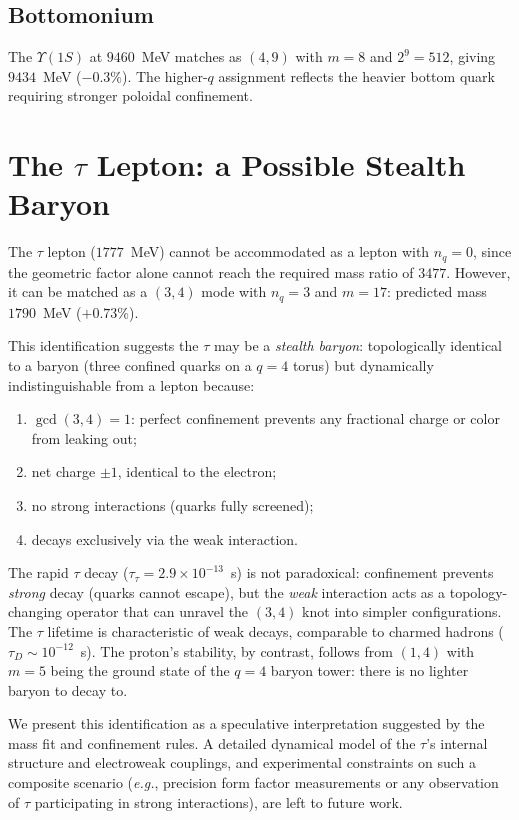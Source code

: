 \documentclass[11pt,a4paper]{article}
\begin{document}
\subsection{Bottomonium}

The $\Upsilon(1S)$ at $9460$~MeV matches as $(4,9)$ with $m = 8$
and $2^9 = 512$, giving $9434$~MeV ($-0.3\%$).  The higher-$q$
assignment reflects the heavier bottom quark requiring stronger
poloidal confinement.


\section{The $\tau$ Lepton: a Possible Stealth Baryon}
\label{sec:tau}

The $\tau$ lepton ($1777$~MeV) cannot be accommodated as a
lepton with $n_q = 0$, since the geometric factor alone cannot
reach the required mass ratio of $3477$.  However, it can be matched as a $(3,4)$ mode with $n_q = 3$ and $m = 17$:
predicted mass $1790$~MeV ($+0.73\%$).

This identification suggests the $\tau$ may be a \emph{stealth baryon}:
topologically identical to a baryon (three confined quarks on a
$q = 4$ torus) but dynamically indistinguishable from a lepton
because:
\begin{enumerate}
  \item $\gcd(3,4) = 1$: perfect confinement prevents any
    fractional charge or color from leaking out;
  \item net charge $\pm 1$, identical to the electron;
  \item no strong interactions (quarks fully screened);
  \item decays exclusively via the weak interaction.
\end{enumerate}

The rapid $\tau$ decay ($\tau_\tau = 2.9 \times 10^{-13}$~s)
is not paradoxical: confinement prevents \emph{strong} decay
(quarks cannot escape), but the \emph{weak} interaction acts
as a topology-changing operator that can unravel the $(3,4)$
knot into simpler configurations.  The $\tau$ lifetime is
characteristic of weak decays, comparable to charmed hadrons
($\tau_D \sim 10^{-12}$~s).  The proton's stability, by
contrast, follows from $(1,4)$ with $m = 5$ being the ground
state of the $q = 4$ baryon tower: there is no lighter baryon
to decay to.

We present this identification as a speculative interpretation
suggested by the mass fit and confinement rules.  A detailed
dynamical model of the $\tau$'s internal structure and electroweak
couplings, and experimental constraints on such a composite
scenario (\textit{e.g.}, precision form factor measurements or any
observation of $\tau$ participating in strong interactions),
are left to future work.
\end{document}
